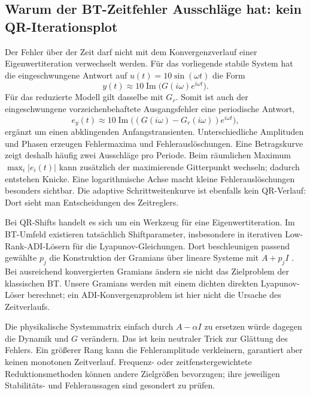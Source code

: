 \documentclass[11pt,a4paper]{article}
\begin{document}
\subsection{Warum der BT-Zeitfehler Ausschläge hat: kein QR-Iterationsplot}
Der Fehler über der Zeit darf nicht mit dem Konvergenzverlauf einer Eigenwertiteration verwechselt werden. Für das vorliegende stabile System hat die eingeschwungene Antwort auf $u(t)=10\sin(\omega t)$ die Form
\begin{equation}
 y(t)\approx 10\operatorname{Im}\bigl(G(i\omega)e^{i\omega t}\bigr).
\end{equation}
Für das reduzierte Modell gilt dasselbe mit $G_r$. Somit ist auch der eingeschwungene vorzeichenbehaftete Ausgangsfehler eine periodische Antwort,
\begin{equation}
 e_y(t)\approx10\operatorname{Im}\bigl((G(i\omega)-G_r(i\omega))e^{i\omega t}\bigr),
\end{equation}
ergänzt um einen abklingenden Anfangstransienten. Unterschiedliche Amplituden und Phasen erzeugen Fehlermaxima und Fehlerauslöschungen. Eine Betragskurve zeigt deshalb häufig zwei Ausschläge pro Periode. Beim räumlichen Maximum $\max_i|e_i(t)|$ kann zusätzlich der maximierende Gitterpunkt wechseln; dadurch entstehen Knicke. Eine logarithmische Achse macht kleine Fehlerauslöschungen besonders sichtbar. Die adaptive Schrittweitenkurve ist ebenfalls kein QR-Verlauf: Dort sieht man Entscheidungen des Zeitreglers.

Bei QR-Shifts handelt es sich um ein Werkzeug für eine Eigenwertiteration. Im BT-Umfeld existieren tatsächlich Shiftparameter, insbesondere in iterativen Low-Rank-ADI-Lösern für die Lyapunov-Gleichungen. Dort beschleunigen passend gewählte $p_j$ die Konstruktion der Gramians über lineare Systeme mit $A+p_jI$ \cite{adi}. Bei ausreichend konvergierten Gramians ändern sie nicht das Zielproblem der klassischen BT. Unsere Gramians werden mit einem dichten direkten Lyapunov-Löser berechnet; ein ADI-Konvergenzproblem ist hier nicht die Ursache des Zeitverlaufs.

Die physikalische Systemmatrix einfach durch $A-\alpha I$ zu ersetzen würde dagegen die Dynamik und $G$ verändern. Das ist kein neutraler Trick zur Glättung des Fehlers. Ein größerer Rang kann die Fehleramplitude verkleinern, garantiert aber keinen monotonen Zeitverlauf. Frequenz- oder zeitfenstergewichtete Reduktionsmethoden können andere Zielgrößen bevorzugen; ihre jeweiligen Stabilitäts- und Fehleraussagen sind gesondert zu prüfen.
\end{document}
